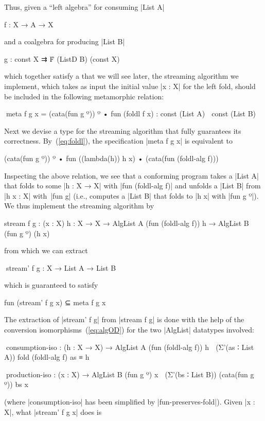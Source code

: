 Thus, given a ``left algebra'' for consuming |List A|
\begin{code}
f : X → A → X
\end{code}
and a coalgebra for producing |List B|
\begin{code}
g : const X ⇉ Ḟ (ListD B) (const X)
\end{code}
which together satisfy a  that we will see later, the streaming algorithm we implement, which takes as input the initial value |x : X| for the left fold, should be included in the following metamorphic relation:
\begin{code}
^^^meta f g x = (cata(fun g º)) º • fun (foldl f x) : const (List A) ↝ const (List B)
\end{code}

Next we devise a type for the streaming algorithm that fully guarantees its correctness.
 By~(\ref{eq:foldl}), the specification |meta f g x| is equivalent to
\begin{code}
(cata(fun g º)) º • fun ((lambda(h)) h x) • (cata(fun (foldl-alg f)))
\end{code}
Inspecting the above relation, we see that a conforming program takes a |List A| that folds to some |h : X → X| with |fun (foldl-alg f)| and unfolds a |List B| from |h x : X| with~|fun g| (i.e., computes a |List B| that folds to |h x| with |fun g º|).
We thus implement the streaming algorithm by
\begin{code}
stream f g :  (x : X) {h : X → X} →
              AlgList A (fun (foldl-alg f)) h → AlgList B (fun g º) (h x)
\end{code}
from which we can extract
\begin{code}
^^^stream' f g : X → List A → List B
\end{code}
which is guaranteed to satisfy
\begin{code}
fun (stream' f g x)  ⊆ meta f g x
\end{code}
The extraction of |stream' f g| from |stream f g| is done with the help of the conversion isomorphisms~(\ref{eq:algOD}) for the two |AlgList| datatypes involved:
\begin{code}
^^^consumption-iso :
  (h : X → X) →
  AlgList A (fun (foldl-alg f)) h ≅ (Σ'(as ∶ List A)) fold (foldl-alg f) as ≡ h

^^^production-iso :
  (x : X) → AlgList B (fun g º) x ≅ (Σ'(bs ∶ List B)) (cata(fun g º)) bs x
\end{code}
(where |consumption-iso| has been simplified by |fun-preserves-fold|).
Given |x : X|, what |stream' f g x| does is
